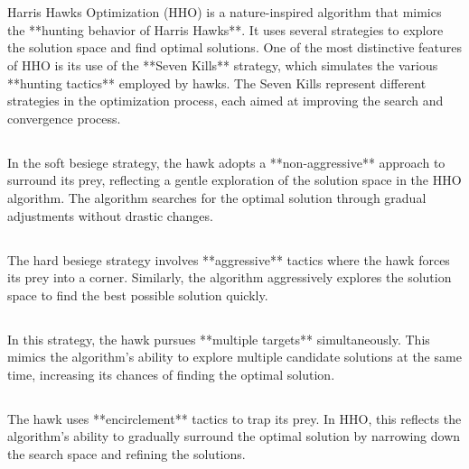 \documentclass{article}
\begin{document}
\setLTR
\section*{}

Harris Hawks Optimization (HHO) is a nature-inspired algorithm that mimics the **hunting behavior of Harris Hawks**. It uses several strategies to explore the solution space and find optimal solutions. One of the most distinctive features of HHO is its use of the **Seven Kills** strategy, which simulates the various **hunting tactics** employed by hawks. The Seven Kills represent different strategies in the optimization process, each aimed at improving the search and convergence process.

\subsection*{}
In the soft besiege strategy, the hawk adopts a **non-aggressive** approach to surround its prey, reflecting a gentle exploration of the solution space in the HHO algorithm. The algorithm searches for the optimal solution through gradual adjustments without drastic changes.

\subsection*{}
The hard besiege strategy involves **aggressive** tactics where the hawk forces its prey into a corner. Similarly, the algorithm aggressively explores the solution space to find the best possible solution quickly.

\subsection*{}
In this strategy, the hawk pursues **multiple targets** simultaneously. This mimics the algorithm’s ability to explore multiple candidate solutions at the same time, increasing its chances of finding the optimal solution.

\subsection*{}
The hawk uses **encirclement** tactics to trap its prey. In HHO, this reflects the algorithm’s ability to gradually surround the optimal solution by narrowing down the search space and refining the solutions.
\end{document}
